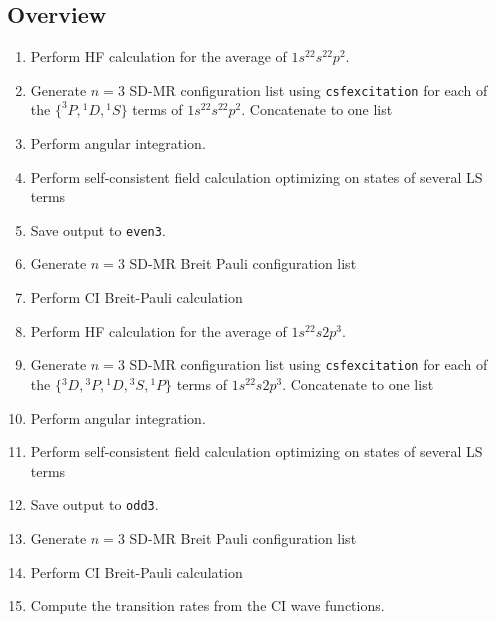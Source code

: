 \documentclass[fleqn,10pt]{book}
\begin{document}
\subsection*{Overview}
\begin{enumerate}
\item Perform HF calculation for the average of $1s^22s^22p^2$.
\item Generate $n = 3$ SD-MR configuration list using \verb+csfexcitation+ 
for each of the $\{^3P,{^1D},{^1S}\}$ terms of $1s^22s^22p^2$. Concatenate to one list
\item Perform angular integration.
\item Perform self-consistent field calculation optimizing on states of several LS terms
\item Save output to \verb+even3+. 
\item Generate $n = 3$ SD-MR Breit Pauli configuration list  
\item Perform CI Breit-Pauli calculation 
\item Perform HF calculation for the average of $1s^22s2p^3$.
\item Generate $n = 3$ SD-MR configuration list using \verb+csfexcitation+ 
for each of the $\{{^3D},{^3P},{^1D},{^3S},{^1P}\}$ terms of $1s^22s2p^3$. Concatenate to one list
\item Perform angular integration.
\item Perform self-consistent field calculation optimizing on states of several LS terms
\item Save output to \verb+odd3+. 
\item Generate $n = 3$ SD-MR Breit Pauli configuration list   
\item Perform CI Breit-Pauli calculation 
\item Compute the transition rates from the CI wave functions.
\end{enumerate} 
\end{document}
